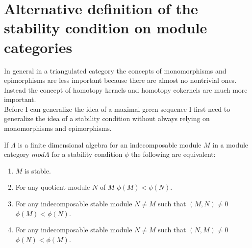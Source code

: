 \section{Alternative definition of the stability condition on module categories}
\indent In general in a triangulated category the concepts of monomorphisms and epimorphisms are less important because there are almost no nontrivial ones. Instead the concept of homotopy kernels and homotopy cokernels are much more important.\\
\indent Before I can generalize the idea of a maximal green sequence I first need to generalize the idea of a stability condition without always relying on monomorphisms and epimorphisms.\\
\begin{theorem}
If $\Lambda$ is a finite dimensional algebra for an indecomposable module $M$ in a module category $mod \Lambda$ for a stability condition $\phi$ the following are equivalent:
\begin{enumerate}
\item $M$ is stable.
\item For any quotient module $N$ of $M$ $\phi(M)<\phi(N)$.
\item For any indecomposable stable module $N\neq M$ such that $(M,N)\neq 0$ $\phi(M)<\phi(N)$.
\item For any indecomposable stable module $N\neq M$ such that $(N,M)\neq 0$ $\phi(N)<\phi(M)$.
\end{enumerate}
\end{theorem}
